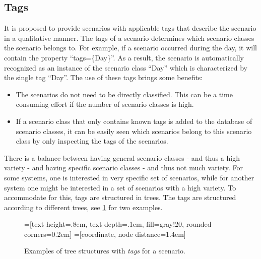 \subsection{Tags}
\label{sec:tags}

It is proposed to provide scenarios with applicable tags that describe the scenario in a qualitative manner. The tags of a scenario determines which scenario classes the scenario belongs to. For example, if a scenario occurred during the day, it will contain the property ``tags=\{Day\}''. As a result, the scenario is automatically recognized as an instance of the scenario class ``Day'' which is characterized by the single tag ``Day''. The use of these tags brings some benefits:
\begin{itemize}
	\item The scenarios do not need to be directly classified. This can be a time consuming effort if the number of scenario classes is high.
	\item If a scenario class that only contains known tags is added to the database of scenario classes, it can be easily seen which scenarios belong to this scenario class by only inspecting the tags of the scenarios.
\end{itemize}

There is a balance between having general scenario classes - and thus a high variety - and having specific scenario classes - and thus not much variety. For some systems, one is interested in very specific set of scenarios, while for another system one might be interested in a set of scenarios with a high variety. To accommodate for this, tags are structured in trees. The tags are structured according to different trees, see \cref{fig:tag trees} for two examples. 

\begin{figure}
	\centering
	=[text height=.8em, text depth=.1em, fill=gray!20, rounded corners=0.2em]
	=[coordinate, node distance=1.4em]
	 \\
	\caption{Examples of tree structures with \emph{tags} for a scenario.}
	\label{fig:tag trees}
\end{figure}

